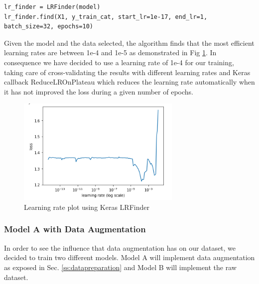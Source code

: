 \documentclass[12pt,a4paper]{scrartcl}
\begin{document}
\begin{lstlisting}[caption={Learning Rate Finder, the jupyter-notebook \emph{Learning\_Rate\_Finder.ipynb} is used to find the learning rate}, label={lst:learning-rate-finder}]
lr_finder = LRFinder(model)
lr_finder.find(X1, y_train_cat, start_lr=1e-17, end_lr=1, batch_size=32, epochs=10)
\end{lstlisting}

Given the model and the data selected, the algorithm finds that the most efficient learning rates are between 1e-4 and 1e-5 as demonstrated in Fig \ref{fig:lr_plot}. In consequence we have decided to use a learning rate of 1e-4 for our training, taking care of cross-validating the results with different learning rates and Keras callback ReduceLROnPlateau \cite{chollet2015keras} which reduces the learning rate automatically when it has not improved the loss during a given number of epochs.


\begin{figure}[H]
    \centering
    \includegraphics[width=0.7\textwidth]{./images/learning_rate_plot.png}
    \caption{Learning rate plot using Keras LRFinder}
    \label{fig:lr_plot}
\end{figure}

\subsubsection{Model A with Data Augmentation}
In order to see the influence that data augmentation has on our dataset, we decided to train two different models. Model A will implement data augmentation as exposed in Sec. \ref{ss:datapreparation} and Model B will implement the raw dataset.
\end{document}
